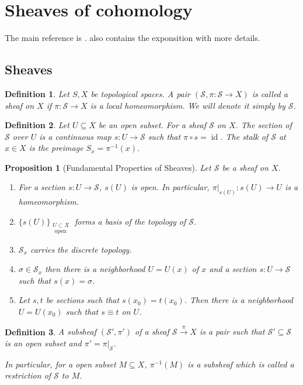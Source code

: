 \documentclass{article}
\newtheorem{proposition}{Proposition}[section]
\newtheorem{definition}{Definition}[section]
\DeclareMathOperator{\id}{id}
\begin{document}
\section{Sheaves of cohomology}
The main reference is \cite{Hir}. \cite{Gr-Fr} also contains the exponsition with more details.
\subsection{Sheaves}

\begin{definition}
  Let $S,X$ be topological spaces. A pair $(\mathcal{S},\pi:\mathcal{S}\to X)$ is called a sheaf on $X$ if $\pi:\mathcal{S}\to X$ is a local homeomorphism. We will denote it simply by $\mathcal{S}$. 
\end{definition}

\begin{definition}
Let $U\subseteq X$ be an open subset. For a sheaf $\mathcal{S}$ on $X$. The section of $\mathcal{S}$ over $U$ is a continuous map $s:U\to \mathcal{S}$ such that $\pi\circ s = \id$. The stalk of $\mathcal{S}$ at $x\in X$ is the preimage $S_x = \pi^{-1}(x)$. 
\end{definition}

\begin{proposition}[Fundamental Properties of Sheaves]Let $\mathcal{S}$ be a sheaf on $X$. 
  \begin{enumerate}[1).]
    \item For a section $s:U\to \mathcal{S}$, $s(U)$ is open. In particular, $\pi|_{s(U)}:s(U)\to U$ is a homeomorphism.
    \item $\{s(U)\}_{\substack{U\subset X\\\text{ open}}}$ forms a basis of the topology of $\mathcal{S}$. 
    \item $\mathcal{S}_x$ carries the discrete topology. 
    \item $\sigma\in \mathcal{S}_x$ then there is a neighborhood $U=U(x)$ of $x$ and a section $s:U\to \mathcal{S}$ such that $s(x) = \sigma$.
    \item Let $s,t$ be sections such that $s(x_0) = t(x_0)$. Then there is a neighborhood $U= U(x_0)$ such that $s\equiv t$ on $U$.
  \end{enumerate}
\end{proposition}

\begin{definition}
  A subsheaf $(\mathcal{S}',\pi')$ of a sheaf $\mathcal{S}\stackrel{\pi}{\to}X$ is a pair such that $\mathcal{S}'\subseteq\mathcal{S}$ is an open subset and $\pi' = \pi|_{\mathcal{S}}$.
  \par In particular, for a open subset $M\subseteq X$, $\pi^{-1}(M)$ is a subsheaf which is called a restriction of $\mathcal{S}$ to $M$.
\end{definition}
\end{document}
